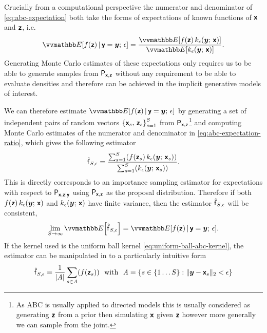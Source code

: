 Crucially from a computational perspective the numerator and denominator of \eqref{eq:abc-expectation} both take the forms of expectations of known functions of $\boldsymbol{\mathsf{x}}$ and $\boldsymbol{\mathsf{z}}$, i.e.
\begin{equation}
  \label{eq:abc-expectation-ratio}
  \expc{f(\rvct{z}) \gvn \rvct{y} = \vct{y};\,\epsilon} 
  =
  \frac{
    \expc{f(\rvct{z})\,k_{\epsilon}(\vct{y};\,\rvct{x})}
  }
  {
    \expc{k_\epsilon(\vct{y};\,\rvct{x})}
  }.
\end{equation}
Generating Monte Carlo estimates of these expectations only requires us to be able to generate samples from $\mathsf{P}_{\boldsymbol{\mathsf{x}},\boldsymbol{\mathsf{z}}}$ without any requirement to be able to evaluate densities and therefore can be achieved in the implicit generative models of interest. 

We can therefore estimate $\expc{f(\rvct{z}) \gvn \rvct{y} = \vct{y};\,\epsilon}$ by generating a set of independent pairs of random vectors $\lbr \rvct{x}_s,\,\rvct{z}_s \rbr_{s=1}^S$ from $\mathsf{P}_{\boldsymbol{\mathsf{x}},\boldsymbol{\mathsf{z}}}$\footnote{As \ac{ABC} is usually applied to directed models this is usually considered as generating $\boldsymbol{\mathsf{z}}$ from a prior then simulating $\boldsymbol{\mathsf{x}}$ given $\boldsymbol{\mathsf{z}}$ however more generally we can sample from the joint.} and computing Monte Carlo estimates of the numerator and denominator in \eqref{eq:abc-expectation-ratio}, which gives the following estimator
\begin{equation}\label{eq:abc-kernel-estimator}
  \hatf_{S,\epsilon} =
  \frac{
  \sum_{s=1}^S \lpa 
    f\lpa\rvct{z}_s\rpa \, 
    k_\epsilon\lpa\vct{y};\,\rvct{x}_s\rpa 
  \rpa
  }
  {
  \sum_{s=1}^S \lpa 
    k_\epsilon\lpa\vct{y};\,\rvct{x}_s\rpa 
  \rpa
  }.
\end{equation}
This is directly corresponds to an importance sampling estimator for expectations with respect to $\mathsf{P}_{\boldsymbol{\mathsf{x}},\boldsymbol{\mathsf{z}}|\boldsymbol{\mathsf{y}}}$ using $\mathsf{P}_{\boldsymbol{\mathsf{x}},\boldsymbol{\mathsf{z}}}$ as the proposal distribution. Therefore if both $f(\boldsymbol{\mathsf{z}})\,k_{\epsilon}(\boldsymbol{y};\,\boldsymbol{\mathsf{x}})$ and $k_{\epsilon}(\boldsymbol{y};\,\boldsymbol{\mathsf{x}})$ have finite variance, then the estimator $\hatf_{S,\epsilon}$ will be consistent,
\begin{equation}
  \lim_{S\to \infty} \expc{\hatf_{S,\epsilon}} = \expc{f(\rvct{z}) \gvn \rvct{y} = \vct{y};\,\epsilon}.
\end{equation}
If the kernel used is the uniform ball kernel \eqref{eq:uniform-ball-abc-kernel}, the estimator can be manipulated in to a particularly intuitive form
\begin{equation}\label{eq:abc-reject-estimator}
  \hatf_{S,\epsilon} =
  \frac{1}{|\set{A}|}
  \sum_{s\in\set{A}} \lpa 
    f\lpa\rvct{z}_s\rpa
  \rpa
  ~~
  \textrm{with}
  ~~
  \set{A} = \lbr s \in \lbrace 1 \dots S \rbrace : \Vert \vct{y} - \rvct{x}_s \Vert_2 < \epsilon \rbr
\end{equation}
